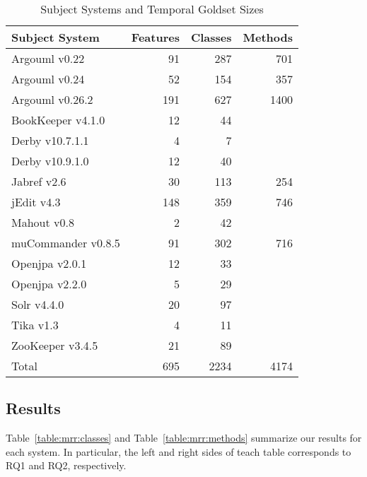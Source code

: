 \begin{table}[h]
\renewcommand{\arraystretch}{1.3}
\footnotesize
\centering
\caption{Subject Systems and Temporal Goldset Sizes}
\begin{tabular}{lrrr}
    \toprule
    Subject System      & Features  & Classes   & Methods \\
    \midrule
    Argouml v0.22 & 91 & 287 & 701 \\
    Argouml v0.24 & 52 & 154 & 357 \\
    Argouml v0.26.2 & 191 & 627 & 1400 \\
    BookKeeper v4.1.0 & 12 & 44 &   \\
    Derby v10.7.1.1 & 4 & 7 &   \\
    Derby v10.9.1.0 & 12 & 40 &   \\
    Jabref v2.6 & 30 & 113 & 254 \\
    jEdit v4.3 & 148 & 359 & 746 \\
    Mahout v0.8 & 2 & 42 &   \\
    muCommander v0.8.5 & 91 & 302 & 716 \\
    Openjpa v2.0.1 & 12 & 33 &   \\
    Openjpa v2.2.0 & 5 & 29 &   \\
    Solr v4.4.0 & 20 & 97 &   \\
    Tika v1.3 & 4 & 11 &   \\
    ZooKeeper v3.4.5 & 21 & 89 &   \\
    \midrule
Total & 695 & 2234 & 4174
\end{tabular}
\label{table:subjects:temporal}
\end{table}


\subsection{Results}

Table~\ref{table:mrr:classes} and Table~\ref{table:mrr:methods}
summarize our results for each system.
In particular, the left and right sides of teach table corresponds to RQ1 and RQ2, respectively.

